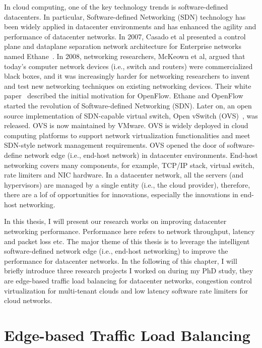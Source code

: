 In cloud computing, one of the key technology trends is software-defined datacenters. 
In particular, Software-defined Networking (SDN) technology has been widely 
applied in datacenter environments and has enhanced the agility and performance of datacenter networks.
In 2007, Casado et al presented a control plane and dataplane separation network architecture for 
Enterprise networks named Ethane~\cite{casado2007ethane}. 
In 2008, networking researchers, McKeown et al, argued that today's computer network 
devices (i.e., switch and routers) were commercialized black boxes, 
and it was increasingly harder for networking researchers to invent and test new networking 
techniques on existing networking devices. Their white paper~\cite{McKeown08} described the initial motivation 
for OpenFlow. Ethane and OpenFlow started the revolution of Software-defined Networking (SDN). 
Later on, an open source implementation of SDN-capable virtual switch, Open vSwitch (OVS)~\cite{Pfaff2015ovs}, was released. 
OVS is now maintained by VMware. 
OVS is widely deployed in cloud computing platforms to support network virtualization functionalities and 
meet SDN-style network management requirements.
OVS opened the door of software-define network edge (i.e., end-host network) in datacenter environments.
End-host networking covers many components, for example, TCP/IP stack, virtual switch, rate limiters and NIC hardware. 
In a datacenter network, all the servers (and hypervisors) are managed by a single entity 
(i.e., the cloud provider), therefore, there are a lof of opportunities for innovations, 
especially the innovations in end-host networking.

In this thesis, I will present our research works on improving datacenter networking performance. 
Performance here refers to network throughput, latency and packet loss etc. 
The major theme of this thesis is to leverage the intelligent software-defined network 
edge (i.e., end-host networking) to improve the performance for datacenter networks.
In the following of this chapter, I will briefly introduce three research projects I worked on 
during my PhD study, they are \textemdash\xspace edge-based traffic load balancing for 
datacenter networks, congestion control virtualization for multi-tenant clouds and 
low latency software rate limiters for cloud networks.

\section{Edge-based Traffic Load Balancing}

